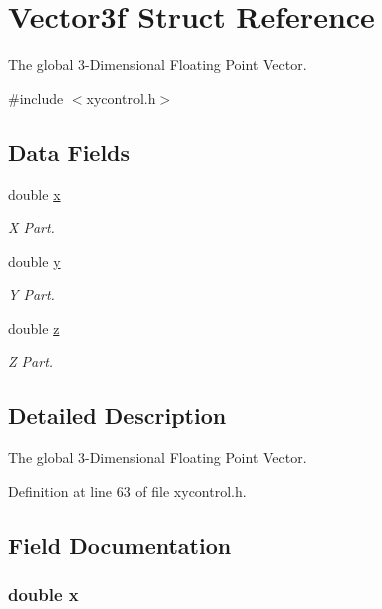 \hypertarget{struct_vector3f}{\section{Vector3f Struct Reference}
\label{struct_vector3f}
}


The global 3-\/\-Dimensional Floating Point Vector.  




{\ttfamily \#include $<$xycontrol.\-h$>$}

\subsection*{Data Fields}
\begin{DoxyCompactItemize}
\item 
double \hyperlink{struct_vector3f_af88b946fb90d5f08b5fb740c70e98c10}{x}
\begin{DoxyCompactList}\small\item\em X Part. \end{DoxyCompactList}\item 
double \hyperlink{struct_vector3f_ab927965981178aa1fba979a37168db2a}{y}
\begin{DoxyCompactList}\small\item\em Y Part. \end{DoxyCompactList}\item 
double \hyperlink{struct_vector3f_ab3e6ed577a7c669c19de1f9c1b46c872}{z}
\begin{DoxyCompactList}\small\item\em Z Part. \end{DoxyCompactList}\end{DoxyCompactItemize}


\subsection{Detailed Description}
The global 3-\/\-Dimensional Floating Point Vector. 



Definition at line 63 of file xycontrol.\-h.



\subsection{Field Documentation}
\hypertarget{struct_vector3f_af88b946fb90d5f08b5fb740c70e98c10}{
\subsubsection[{x}]{\setlength{\rightskip}{0pt plus 5cm}double x}}\label{struct_vector3f_af88b946fb90d5f08b5fb740c70e98c10}



